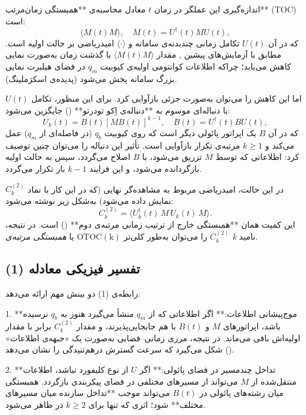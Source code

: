 اندازه‌گیری این عملگر در زمان \( t \) معادل محاسبه‌ی **همبستگی زمان‌مرتب** (TOC)
 است:
\[
\langle M(t) M \rangle, \quad M(t) = U^\dagger(t) M U(t),
\]
که در آن \( U(t) \) تکامل زمانی چند‌بدنه‌ی سامانه و \( \langle \cdot \rangle \) امیدریاضی بر حالت اولیه است.  
مطابق با آزمایش‌های پیشین \cite{Kaufman2016, Zhang2023}, مقدار \(\langle M(t) M \rangle\) با گذشت زمان به‌صورت نمایی کاهش می‌یابد؛ چراکه اطلاعات کوانتومی اولیه‌ی کیوبیت \( q_m \) در فضای هیلبرت نمایی بزرگ سامانه پخش می‌شود (پدیده‌ی اسکرَملینگ).

اما این کاهش را می‌توان به‌صورت جزئی بازآوایی کرد. برای این منظور، تکامل \( U(t) \) با دنباله‌ای موسوم به **دنباله‌ی  اِکو تودرتو** () جایگزین می‌شود:
\[
U_k(t) = B(t) [M B(t)]^{k-1}, \quad B(t) = U^\dagger(t) B U(t),
\]
که در آن \( B \) یک اپراتور پائولی دیگر است که روی کیوبیت \( q_b \) (در فاصله‌ای از \( q_m \)) عمل می‌کند و \( k \ge 1 \) مرتبه‌ی تکرار بازآوایی است.  
تأثیر این دنباله را می‌توان چنین توصیف کرد: اطلاعاتی که توسط \( M \) تزریق می‌شود، با \( B \) اصلاح می‌گردد، سپس به حالت اولیه بازگردانده می‌شود، و این فرایند \( k-1 \) بار تکرار می‌گردد.

در این حالت، امیدریاضی مربوط به مشاهده‌گر نهایی (که در این کار با نماد \( C^{(2)}_k \) نمایش داده می‌شود) به‌شکل زیر نوشته می‌شود:
\[
C^{(2)}_k = \langle U_k^\dagger(t)\, M\, U_k(t)\, M \rangle.
\tag{1}
\]
این کمیت همان **همبستگی خارج از ترتیب زمانی مرتبه‌ی دوم** () است. در نتیجه، \( C^{(2)}_k \) را می‌توان به‌طور کلی‌تر \(\mathrm{OTOC(k)}\) یا \textit{همبستگی مرتبه‌ی k} نامید.


\subsection{تفسیر فیزیکی معادله (1)}

رابطه‌ی (1) دو بینش مهم ارائه می‌دهد:

1. **موج‌پیشانی اطلاعات:**  
اگر اطلاعاتی که از \( q_m \) منشأ می‌گیرد هنوز به \( q_b \) نرسیده باشد، اپراتورهای \( M \) و \( B(t) \) با هم جابجایی‌پذیرند، و مقدار \( C^{(2)}_k \) برابر با مقدار اولیه‌اش باقی می‌ماند.  
در نتیجه، مرزی زمانی–فضایی به‌صورت یک «جبهه‌ی اطلاعات» () شکل می‌گیرد که سرعت گسترش درهم‌تنیدگی را نشان می‌دهد.

2. **تداخل چندمسیر در فضای پائولی:**  
اگر \( U \) از نوع کلیفورد نباشد، اطلاعات منتقل‌شده از \( M \) می‌تواند از مسیرهای مختلفی در فضای پیکربندی بازگردد. همبستگی میان رشته‌های پائولی در \( B(t) \) می‌تواند موجب **تداخل سازنده میان مسیرهای مختلف** شود؛ اثری که تنها برای \( k \ge 2 \) در  ظاهر می‌شود.
